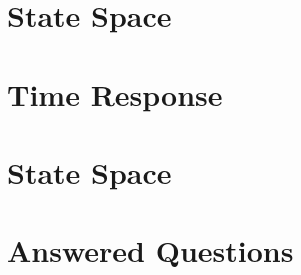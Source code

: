\documentclass{article}
\begin{document}
\pagecolor{mainTheme}\afterpage{\pagecolor{backCirc}}
\maketitle
\thispagestyle{empty}


\vspace*{-0.5 em}
\section{State Space}

\vspace{10pt}

\section{Time Response}

\vspace{10pt}

\section{State Space}

\vspace{10pt}

\section{Answered Questions}

\end{document}
